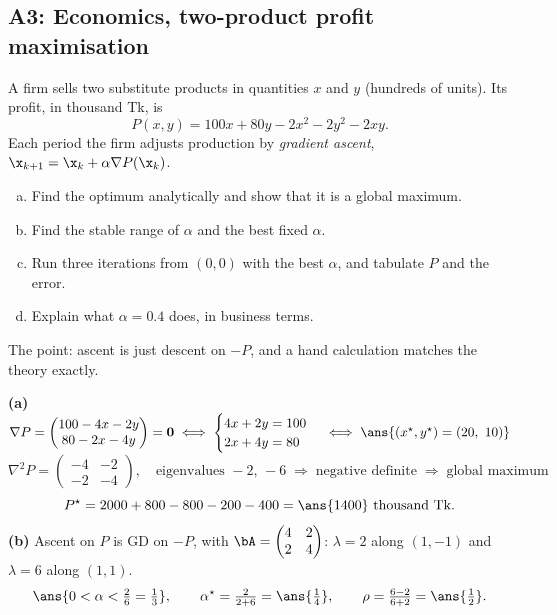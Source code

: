 \subsection{A3: Economics, two-product profit maximisation}

\begin{frame}{}
  \begin{probbox}
    A firm sells two substitute products in quantities $x$ and $y$ (hundreds of units). Its profit,
    in thousand Tk, is
    \[
      P(x,y) = 100x + 80y - 2x^2 - 2y^2 - 2xy .
    \]
    Each period the firm adjusts production by \emph{gradient ascent}, $\x_{k+1} = \x_k + \alpha\nabla P(\x_k)$.
    \begin{enumerate}[(a)]
      \item Find the optimum analytically and show that it is a global maximum.
      \item Find the stable range of $\alpha$ and the best fixed $\alpha$.
      \item Run three iterations from $(0,0)$ with the best $\alpha$, and tabulate $P$ and the error.
      \item Explain what $\alpha = 0.4$ does, in business terms.
    \end{enumerate}
  \end{probbox}
  \footnotesize\textcolor{mGrey}{The point: ascent is just descent on $-P$, and a hand calculation matches the theory exactly.}
\end{frame}

\begin{frame}{}
  \textbf{(a)}
  $\nabla P = \begin{pmatrix}100 - 4x - 2y\\ 80 - 2x - 4y\end{pmatrix} = \mathbf 0
  \iff \begin{cases}4x + 2y = 100\\ 2x + 4y = 80\end{cases}
  \iff \ans{(x^\star,y^\star) = (20,\ 10)}$
  \[
    \nabla^2P = \begin{pmatrix}-4&-2\\-2&-4\end{pmatrix}, \quad \text{eigenvalues } -2,\,-6
    \;\Rightarrow\; \text{negative definite} \;\Rightarrow\; \text{global maximum}
  \]
  \[
    P^\star = 2000 + 800 - 800 - 200 - 400 = \ans{1400} \text{ thousand Tk}.
  \]
  \textbf{(b)} Ascent on $P$ is GD on $-P$, with $\bA = \begin{pmatrix}4&2\\2&4\end{pmatrix}$:
  $\lambda = 2$ along $(1,-1)$ and $\lambda = 6$ along $(1,1)$.
  \[
    \ans{0 < \alpha < \tfrac26 = \tfrac13},\qquad
    \alpha^\star = \tfrac{2}{2+6} = \ans{\tfrac14},\qquad
    \rho = \tfrac{6-2}{6+2} = \ans{\tfrac12}.
  \]
\end{frame}

